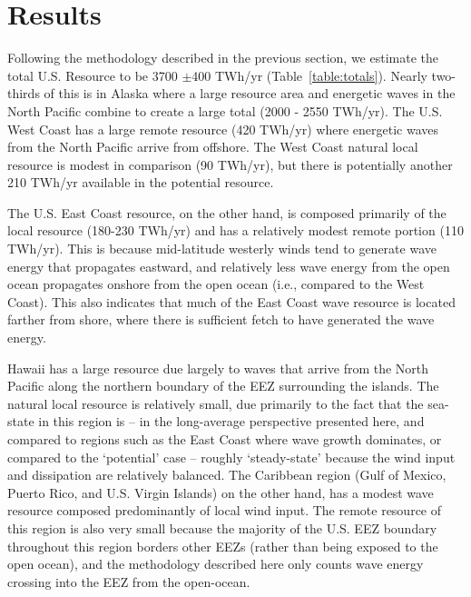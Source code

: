 \section{Results}

Following the methodology described in the previous section, we estimate the total U.S. Resource to be 3700 $\pm$400 TWh/yr (Table~\ref{table:totals}). Nearly two-thirds of this is in Alaska where a large resource area and energetic waves in the North Pacific combine to create a large total (2000 - 2550 TWh/yr). The U.S. West Coast has a large remote resource (420 TWh/yr) where energetic waves from the North Pacific arrive from offshore.  The West Coast natural local resource is modest in comparison (90 TWh/yr), but there is potentially another 210 TWh/yr available in the potential resource.

The U.S. East Coast resource, on the other hand, is composed primarily of the local resource (180-230 TWh/yr) and has a relatively modest remote portion (110 TWh/yr). This is because mid-latitude westerly winds tend to generate wave energy that propagates eastward, and relatively less wave energy from the open ocean propagates onshore from the open ocean (i.e., compared to the West Coast). This also indicates that much of the East Coast wave resource is located farther from shore, where there is sufficient fetch to have generated the wave energy. 

Hawaii has a large resource due largely to waves that arrive from the North Pacific along the northern boundary of the EEZ surrounding the islands. The natural local resource is relatively small, due primarily to the fact that the sea-state in this region is -- in the long-average perspective presented here, and compared to regions such as the East Coast where wave growth dominates, or compared to the `potential' case -- roughly `steady-state' because the wind input and dissipation are relatively balanced. The Caribbean region (Gulf of Mexico, Puerto Rico, and U.S. Virgin Islands) on the other hand, has a modest wave resource composed predominantly of local wind input.  The remote resource of this region is also very small because the majority of the U.S. EEZ boundary throughout this region borders other EEZs (rather than being exposed to the open ocean), and the methodology described here only counts wave energy crossing into the EEZ from the open-ocean.

